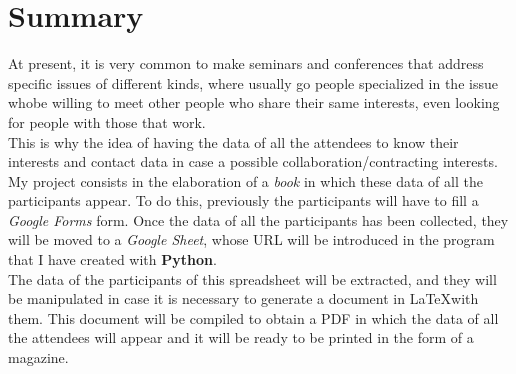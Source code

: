 \documentclass[a4paper, 12pt]{book}
\begin{document}

\chapter*{Summary}

At present, it is very common to make seminars and conferences that address specific issues of different kinds, where usually go people specialized in the issue whobe willing to meet other people who share their same interests, even looking for people with those that work.\\

This is why the idea of having the data of all the attendees to know their interests and contact data in case a possible collaboration/contracting interests.\\

My project consists in the elaboration of a \textit{book} in which these data of all the participants appear. To do this, previously the participants will have to fill a \textit{Google Forms} form. Once the data of all the participants has been collected, they will be moved to a \textit{Google Sheet}, whose URL will be introduced in the program that I have created with \textbf{Python}.\\

The data of the participants of this spreadsheet will be extracted, and they will be manipulated in case it is necessary to generate a document in \LaTeX with them. This document will be compiled to obtain a PDF in which the data of all the attendees will appear and it will be ready to be printed in the form of a magazine.




\tableofcontents
\cleardoublepage
\listoffigures %
\end{document}
